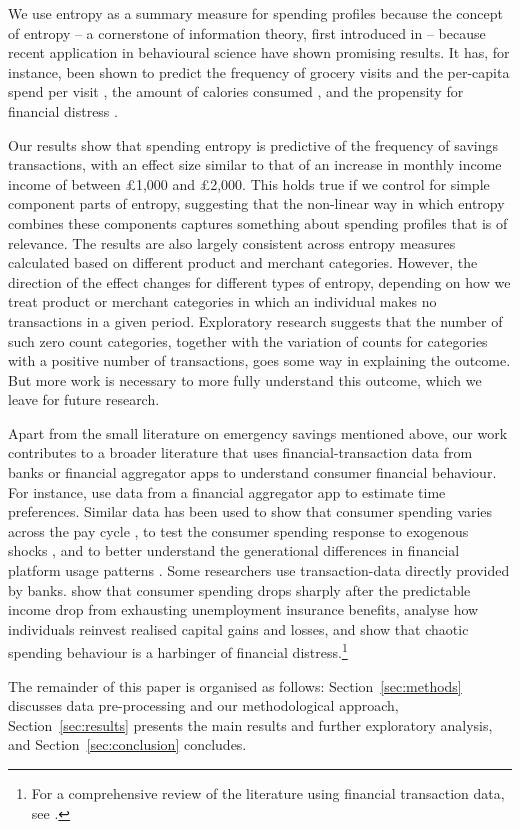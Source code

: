 We use entropy as a summary measure for spending profiles because the concept of entropy -- a cornerstone of information theory, first introduced in \citet{shannon1948mathematical} -- because recent application in behavioural science have shown promising results. It has, for instance, been shown
to predict the frequency of grocery visits and the per-capita spend per visit
\citep{guidotti2015behavioral}, the amount of calories consumed
\citep{skatova2019those}, and the propensity for financial distress
\citep{muggleton2020evidence}.

Our results show that spending entropy is predictive of the frequency of
savings transactions, with an effect size similar to that of an increase in
monthly income income of between \pounds1,000 and \pounds2,000. This holds true
if we control for simple component parts of entropy, suggesting that the
non-linear way in which entropy combines these components captures something
about spending profiles that is of relevance. The results are also largely
consistent across entropy measures calculated based on different product and
merchant categories. However, the direction of the effect changes for
different types of entropy, depending on how we treat product or
merchant categories in which an individual makes no transactions in a given
period. Exploratory research suggests that the number of such zero count
categories, together with the variation of counts for categories with a
positive number of transactions, goes some way in explaining the outcome. But
more work is necessary to more fully understand this outcome, which we leave
for future research.

Apart from the small literature on emergency savings mentioned above, our work
contributes to a broader literature that uses financial-transaction data
from banks or financial aggregator apps to understand consumer financial
behaviour. For instance, \citet{kuchler2020sticking} use data from a
financial aggregator app to estimate time preferences. Similar data has been
used to show that consumer spending varies across the pay cycle
\citep{gelman2014harnessing,olafsson2018liquid}, to test the consumer spending
response to exogenous shocks \citep{baker2018debt,baugh2014disentangling}, and
to better understand the generational differences in financial platform usage
patterns \citep{carlin2019generational}. Some researchers use transaction-data
directly provided by banks. \citet{ganong2019consumer} show that consumer
spending drops sharply after the predictable income drop from exhausting
unemployment insurance benefits, \citet{meyer2018fully} analyse how individuals
reinvest realised capital gains and losses, and \citet{muggleton2020evidence}
show that chaotic spending behaviour is a harbinger of financial
distress.\footnote{For a comprehensive review of the literature using financial
transaction data, see \citet{baker2022household}.}

The remainder of this paper is organised as follows: Section~\ref{sec:methods}
discusses data pre-processing and our methodological approach,
Section~\ref{sec:results} presents the main results and further exploratory
analysis, and Section~\ref{sec:conclusion} concludes.

